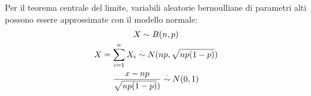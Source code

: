 Per il teorema centrale del limite, variabili aleatorie bernoulliane di parametri alti possono essere approssimate con il modello normale:
\begin{gather*}
	X\sim B(n,p) \\
	X = \sum_{i=1}^n X_i \overset{\cdot}{\sim} N(np, \sqrt{np(1-p)}) \\
	\frac{x-np}{\sqrt{np(1-p)})} \overset{\cdot}{\sim} N(0,1)
\end{gather*}
